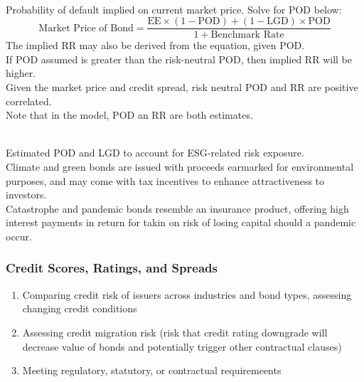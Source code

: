 \begin{remark} \\
Probability of default implied on current market price. Solve for POD below:
\begin{equation}
\text{Market Price of Bond} = \frac{\text{EE} \times (1-\text{POD}) + (1- \text{LGD})\times \text{POD}}{1 + \text{Benchmark Rate}} \nonumber
\end{equation}
The implied RR may also be derived from the equation, given POD.\\
If POD assumed is greater than the risk-neutral POD, then implied RR will be higher.\\
Given the market price and credit spread, risk neutral POD and RR are positive correlated.\\
Note that in the model, POD an RR are both estimates.
\end{remark}

\begin{remark} \\
Estimated POD and LGD to account for ESG-related risk exposure.\\
Climate and green bonds are issued with proceeds earmarked for environmental purposes, and may come with tax incentives to enhance attractiveness to investors.\\
Catastrophe and pandemic bonds resemble an insurance product, offering high interest payments in return for takin on risk of losing capital should a pandemic occur.
\end{remark}

\subsubsection{Credit Scores, Ratings, and Spreads}

\begin{remark} 
\begin{enumerate}[label=\roman*.]
\setlength{\itemsep}{0pt}
\item Comparing credit risk of issuers across industries and bond types, assessing changing credit conditions
\item Assessing credit migration risk (risk that credit rating downgrade will decrease value of bonds and potentially trigger other contractual clauses)
\item Meeting regulatory, statutory, or contractual requiremeents
\end{enumerate}
\end{remark}

